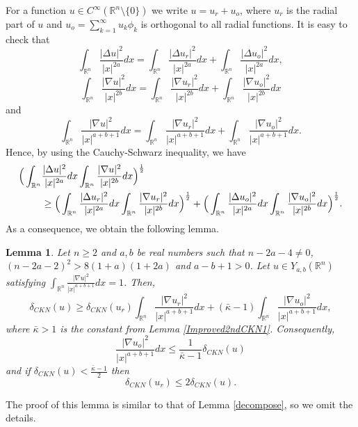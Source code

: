 \documentclass[a4paper,12pt]{article}
\theoremstyle{plain}
\newtheorem{lemma}[theorem]{Lemma}
\theoremstyle{definition}
\theoremstyle{remark}
\def\R{\mathbb R}%
\def\irn{\int_{\R^n}}
\numberwithin{equation}{section}
\begin{document}
For a function $u \in C^\infty(\R^n\setminus\{0\})$ we write $u = u_r + u_o$, where $u_r $ is the radial part of $u$ and $u_o = \sum_{k=1}^\infty u_k \phi_k$ is orthogonal to all radial functions. It is easy to check that
\[
\irn \frac{|\Delta u|^2}{|x|^{2a}} dx = \irn \frac{|\Delta u_r|^2}{|x|^{2a}} dx + \irn \frac{|\Delta u_o|^2}{|x|^{2a}} dx,
\]
\[
\irn \frac{|\nabla u|^2}{|x|^{2b}} dx = \irn \frac{|\nabla u_r|^2}{|x|^{2b}} dx + \irn \frac{|\nabla u_o|^2}{|x|^{2b}} dx
\]
and
\[
\irn \frac{|\nabla u|^2}{|x|^{a+b+1}} dx = \irn \frac{|\nabla u_r|^2}{|x|^{a+b+1}} dx + \irn \frac{|\nabla u_o|^2}{|x|^{a+b+1}} dx.
\]
Hence, by using the Cauchy-Schwarz inequality, we have
\begin{align*}%
\Big(\irn &\frac{|\Delta u|^2}{|x|^{2a}} dx \irn \frac{|\nabla u|^2}{|x|^{2b}} dx\Big)^{\frac12} \notag\\
&\geq \Big(\irn \frac{|\Delta u_r|^2}{|x|^{2a}} dx \irn \frac{|\nabla u_r|^2}{|x|^{2b}} dx\Big)^{\frac12} + \Big(\irn \frac{|\Delta u_o|^2}{|x|^{2a}} dx \irn \frac{|\nabla u_o|^2}{|x|^{2b}} dx\Big)^{\frac12}.
\end{align*}
As a consequence, we obtain the following lemma.
\begin{lemma}\label{decomposeDelta}
Let $n\geq 2$ and $a, b$ be real numbers such that $n-2a -4\not=0$, $(n-2a -2)^2 > 8(1+a)(1+2a)$ and $a-b +1 >0$. Let $u \in Y_{a,b}(\R^n)$ satisfying  $\irn \frac{|\nabla u|^2}{|x|^{a+b+1}} dx =1$. Then,
\begin{equation*}%
\delta_{CKN}(u) \geq \delta_{CKN}(u_r) \irn \frac{|\nabla u_r|^2}{|x|^{a+b+1}} dx + (\bar{\kappa} -1) \irn \frac{|\nabla u_o|^2}{|x|^{a+b+1}} dx,
\end{equation*} 
where $\bar{\kappa}>1$ is the constant from Lemma \ref{Improved2ndCKN1}. Consequently,
\begin{equation*}%
 \frac{|\nabla u_o|^2}{|x|^{a+b+1}} dx \leq \frac{1}{\bar{\kappa} -1} \delta_{CKN}(u)
\end{equation*}
and if $\delta_{CKN}(u) < \frac{\bar{\kappa} -1}2$ then
\begin{equation*}%
\delta_{CKN}(u_r) \leq 2 \delta_{CKN}(u).
\end{equation*}
\end{lemma}
The proof of this lemma is similar to that of Lemma \ref{decompose}, so we omit the details.
\end{document}
